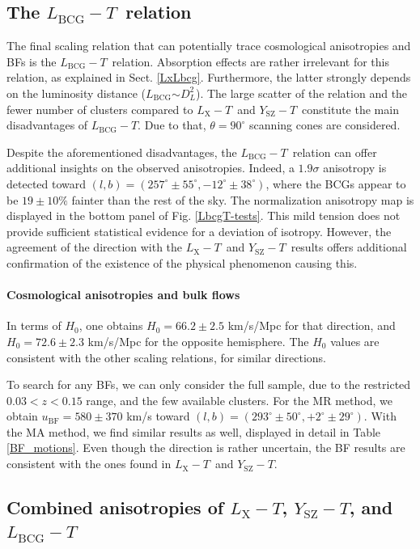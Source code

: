 \documentclass{aa}   %
\newcommand{\LT}{$L_{\text{X}}-T$}
\newcommand{\YT}{$Y_{\text{SZ}}-T$}
\newcommand{\LbcgT}{$L_{\text{BCG}}-T$}
\newcommand{\Lbcg}{$L_{\text{BCG}}$}
\newcommand{\ubf}{$u_{\text{BF}}$}
\begin{document}
\subsection{The \LbcgT\ relation}

The final scaling relation that can potentially trace cosmological anisotropies and BFs is the \LbcgT\ relation. Absorption effects are rather irrelevant for this relation, as explained in Sect. \ref{LxLbcg}. Furthermore, the latter strongly depends on the luminosity distance (\Lbcg$\sim D_L^2$). The large scatter of the relation and the fewer number of clusters compared to \LT\ and \YT\ constitute the main disadvantages of \LbcgT . Due to that, $\theta=90^{\circ}$ scanning cones are considered. 

Despite the aforementioned disadvantages, the \LbcgT\ relation can offer additional insights on the observed anisotropies. Indeed, a $1.9\sigma$ anisotropy is detected toward $(l,b)=(257^{\circ}\pm 55^{\circ},-12^{\circ}\pm 38^{\circ})$, where the BCGs appear to be $19\pm 10\%$ fainter than the rest of the sky. The normalization anisotropy map is displayed in the bottom panel of Fig. \ref{LbcgT-tests}. This mild tension does not provide sufficient statistical evidence for a deviation of isotropy. However, the agreement of the direction with the \LT\ and \YT\ results offers additional confirmation of the existence of the physical phenomenon causing this. 

\paragraph{Cosmological anisotropies and bulk flows}

In terms of $H_0$, one obtains $H_0=66.2\pm 2.5$ km/s/Mpc for that direction, and $H_0=72.6\pm 2.3$ km/s/Mpc for the opposite hemisphere. The $H_0$ values are consistent with the other scaling relations, for similar directions.

To search for any BFs, we can only consider the full sample, due to the restricted $0.03<z<0.15$ range, and the few available clusters. For the MR method, we obtain \ubf$=580\pm 370$ km/s toward $(l,b)=(293^{\circ}\pm 50^{\circ},+2^{\circ}\pm 29^{\circ})$. With the MA method, we find similar results as well, displayed in detail in Table \ref{BF_motions}. Even though the direction is rather uncertain, the BF results are consistent with the ones found in \LT\ and \YT. 

\subsection{Combined anisotropies of \LT, \YT, and \LbcgT}\label{joint_all}
\end{document}
